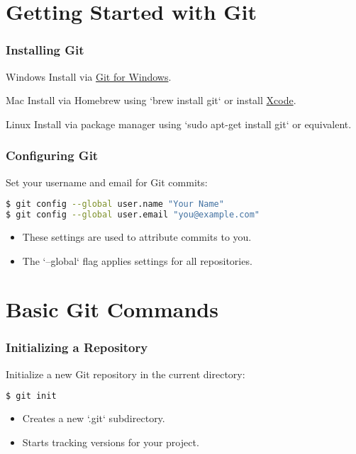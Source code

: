 \section{Getting Started with Git}

\begin{frame}
  \frametitle{Installing Git}
  \begin{block}{Windows}
    Install via \href{https://git-scm.com/download/win}{Git for Windows}.
  \end{block}
  \begin{block}{Mac}
    Install via Homebrew using `brew install git` or install \href{https://developer.apple.com/xcode/}{Xcode}.
  \end{block}
  \begin{block}{Linux}
    Install via package manager using `sudo apt-get install git` or equivalent.
  \end{block}
\end{frame}

\begin{frame}[fragile]
  \frametitle{Configuring Git}
  Set your username and email for Git commits:
  \begin{lstlisting}[language=bash]
$ git config --global user.name "Your Name"
$ git config --global user.email "you@example.com"
  \end{lstlisting}
  \begin{itemize}
    \item These settings are used to attribute commits to you.
    \item The `--global` flag applies settings for all repositories.
  \end{itemize}
\end{frame}

\section{Basic Git Commands}

\begin{frame}[fragile]
  \frametitle{Initializing a Repository}
  Initialize a new Git repository in the current directory:
  \begin{lstlisting}[language=bash]
$ git init
  \end{lstlisting}
  \begin{itemize}
    \item Creates a new `.git` subdirectory.
    \item Starts tracking versions for your project.
  \end{itemize}
\end{frame}

